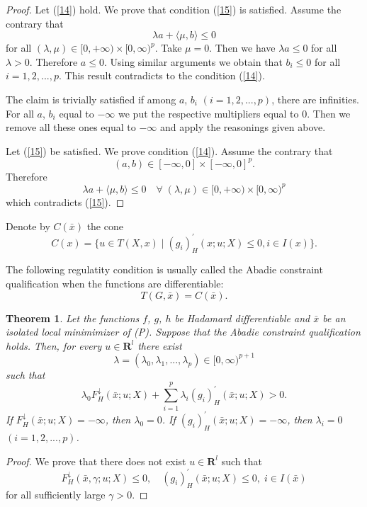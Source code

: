 \documentclass[12pt]{article}
\newtheorem{theorem}{Theorem}[section]
\def\R{\mathbf R}
\def\E{\mathbf R^l}
\def\ld#1{#1^{\downarrow}_{H}}
\def\d#1{#1^{\prime}_{H}}
\newcommand{\scalpr}[2]{\langle#1,#2\rangle}
\begin{document}
{\begin{proof}
Let (\ref{14}) hold. We prove that condition (\ref{15}) is satisfied. Assume the contrary
that
\[
\lambda a+\scalpr{\mu}{b}\le 0
\]
for all $(\lambda,\mu)\in[0,+\infty)\times[0,\infty)^p$. Take $\mu=0$.
Then we have $\lambda a\le 0$ for all $\lambda>0$. Therefore $a\le 0$.
Using similar arguments we obtain that $b_i\le 0$ for all
$i=1,2,...,p$. 
This result contradicts to the condition (\ref{14}).

The claim is trivially satisfied if among $a$, $b_i$ $(i=1,2,...,p)$,
 there are infinities. For all $a$, $b_i$ equal to $-\infty$
we put the respective multipliers equal to 0. Then we remove all these ones equal
to $-\infty$ and apply the reasonings given above.

Let (\ref{15}) be satisfied. We prove condition (\ref{14}). Assume the
contrary that
\[
(a,b)\in [-\infty,0]\times [-\infty,0]^p.
\]
Therefore
\[
\lambda a+\scalpr{\mu}{b}\le 0\quad\forall\;
(\lambda,\mu)\in[0,+\infty)\times[0,\infty)^p
\]
which contradicts (\ref{15}).
\end{proof}


Denote by $C(\bar x)$ the cone
\[
C(x)=\{u\in T(X,x)\mid \d {(g_i)} (x;u;X)\le 0, i\in I(x)\}.
\]

The following regulatity condition is usually called the Abadie constraint qualification when the functions are differentiable:
\[
 T(G,\bar x)=C(\bar x).
\]

\begin{theorem}
Let the functions $f$, $g$, $h$ be Hadamard differentiable and $\bar x$ be
an isolated local minimimizer of {\rm (P)}. Suppose that the Abadie constraint qualification holds.
 Then, for every $u\in\E$
there exist
\[
\lambda=(\lambda_0,\lambda_1,...,\lambda_p)\in[0,\infty)^{p+1}
\]
such that
\begin{equation}
\lambda_0\ld F(\bar x;u;X)+\sum_{i=1}^p\lambda_i\d {(g_i)} (\bar x;u;X)> 0.
\end{equation}
If $\ld F (\bar x;u;X)=-\infty$, then $\lambda_0=0$.
If $\d {(g_i)} (\bar x;u;X)=-\infty$, then $\lambda_i=0$  $(i=1,2,...,p)$.
\end{theorem}
\begin{proof}
We prove that there does not exist $u\in\E$ such that
\begin{equation}\label{system}
\ld F (\bar x,\gamma;u;X)\le 0,\quad \d {(g_i)}(\bar x;u;X)\le 0,\; i\in I(\bar x)
\end{equation}
for all sufficiently large $\gamma>0$. 


\end{proof}}
\end{document}
